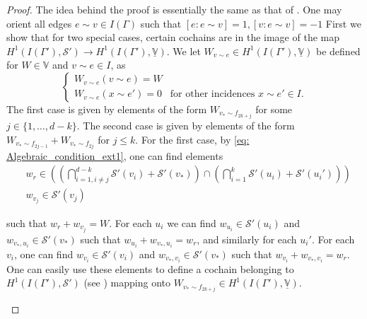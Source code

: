 \documentclass{article}
\theoremstyle{definition}
\theoremstyle{remark}
\begin{document}
\begin{proof}
    The idea behind the proof is essentially the same as that of . One may orient all edges $e\sim v \in I(\Gamma)$ such that $[e: e\sim v]=1,[v: e\sim v]=-1$ 
    First we show that for two special cases, certain cochains are in the image of the map $H^{1}(I(\Gamma'), \mathcal{S}') \rightarrow H^{1}(I(\Gamma'), \underline{\mathbb{V}})$. We let $W_{v\sim e} \in H^{1}(I(\Gamma'), \underline{\mathbb{V}})$ be defined for $W\in \mathbb{V}$ and $v \sim e \in I$, as
\begin{equation*}
\begin{cases}
    W_{v\sim e}(v\sim e) = W \\
    W_{v\sim e}(x\sim e') = 0 &\text{for other incidences $x \sim e' \in I$.} 
\end{cases}
\end{equation*}
The first case is given by elements of the form $W_{v_* \sim f_{2k + j}}$ for some $j \in \{1, \dots, d-k\}$. The second case is given by elements of the form $W_{v_* \sim f_{2j-1}} + W_{v_* \sim f_{2j}}$ for $j \leq k$. 
 For the first case, by \eqref{eq: Algebraic_condition_ext1}, one can find elements
\begin{align*}
    &w_r \in \left( \left( \bigcap_{i=1, i \neq j}^{d-k}\mathcal{S}'(v_{i}) + \mathcal{S}'(v_*)\right) \cap \left( \bigcap_{i=1}^{k}\mathcal{S}'(u_i) + \mathcal{S}'(u_i') \right)\right) \\
    &w_{v_{j}} \in \mathcal{S}'(v_{j}) 
\end{align*}

such that $w_r + w_{v_{j}}  = W$. For each $u_i$ we can find $w_{u_i}\in \mathcal{S}'(u_i)$ and $w_{v_*, u_i}\in \mathcal{S}'(v_*)$ such that $w_{u_i} +w_{v_*, u_i} = w_{r}$, and similarly for each $u_i'$. For each $v_i$, one can find $w_{v_i}\in \mathcal{S}'(v_i)$ and $w_{v_*, v_i}\in \mathcal{S}'(v_*)$ such that $w_{v_i} + w_{v_*, v_i} = w_r$. One can easily use these elements to define a cochain belonging to $H^{1}(I(\Gamma'),\mathcal{S}')$ (see ) mapping onto $W_{v_* \sim f_{2k + j}} \in H^{1}(I(\Gamma'), \underline{\mathbb{V}})$.

\begin{figure}[h!]
\centering
{}
\end{figure}
\end{proof}
\end{document}
